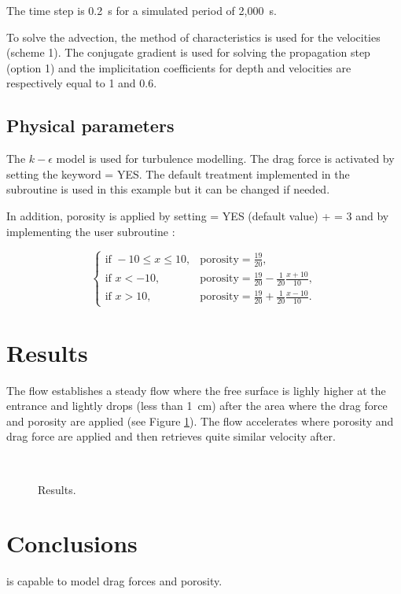 The time step is 0.2~s for a simulated period of 2,000~s.

To solve the advection, the method of characteristics
is used for the velocities (scheme 1).
The conjugate gradient
is used for solving the propagation step (option 1) and
the implicitation coefficients
for depth and velocities are respectively equal to 1 and 0.6.

\subsection{Physical parameters}

The $k-\epsilon$ model is used for turbulence modelling.
The drag force is activated by setting the keyword
 = YES.
The default treatment implemented in the  subroutine
is used in this example but it can be changed if needed.

In addition, porosity is applied by setting
 = YES (default value) +
 = 3 and
by implementing the user subroutine :

\begin{equation*}
\left\{
    \begin{array}{rl}
        \textrm{if } -10 \le x \le 10, & \textrm{porosity} = \frac{19}{20}, \\
        \textrm{if } x < -10, & \textrm{porosity} = \frac{19}{20} - \frac{1}{20} \frac{x+10}{10},\\
        \textrm{if } x > 10,  & \textrm{porosity} = \frac{19}{20} + \frac{1}{20} \frac{x-10}{10}.
    \end{array}
\right.
\end{equation*}

\section{Results}

The flow establishes a steady flow where the free surface is lighly higher
at the entrance and lightly drops (less than 1~cm) after the area where the drag
force and porosity are applied (see Figure \ref{t2d:dragforce:results}).
The flow accelerates where porosity and drag force are applied and then
retrieves quite similar velocity after.

\begin{figure}[H]
  \centering
   \\
  \caption{Results.}\label{t2d:dragforce:results}
\end{figure}

\section{Conclusions}

 is capable to model drag forces and porosity.
